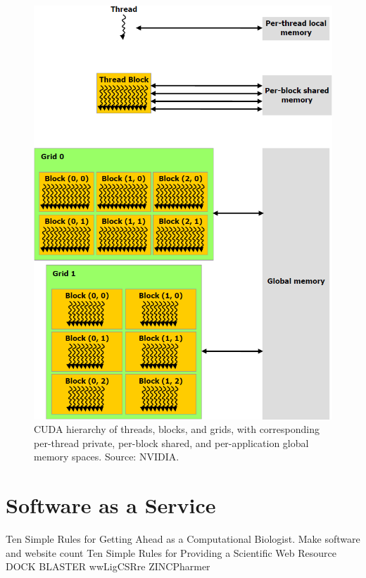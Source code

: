 \begin{figure}
\centering
\includegraphics[width=\textwidth]{GPU/CUDAMemoryHierarchy.png}
\caption{CUDA hierarchy of threads, blocks, and grids, with corresponding per-thread private, per-block shared, and per-application global memory spaces. Source: NVIDIA.}
\label{GPU:CUDAMemoryHierarchy}
\end{figure}

\section{Software as a Service}

Ten Simple Rules for Getting Ahead as a Computational Biologist. Make software and website count \citep{260}
Ten Simple Rules for Providing a Scientific Web Resource \citep{677}
DOCK BLASTER
wwLigCSRre
ZINCPharmer

\chapterend
